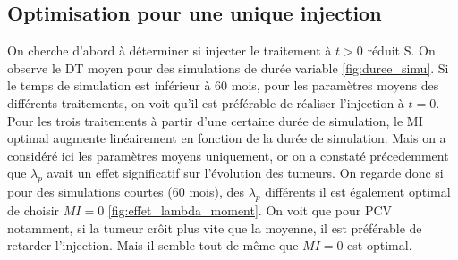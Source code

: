 \documentclass[12pt,a4paper]{article}
\begin{document}
\subsection{Optimisation pour une unique injection}
On cherche d'abord à déterminer si injecter le traitement à $t > 0$  réduit S.  On observe le DT moyen pour des simulations de durée variable \ref{fig:duree_simu}. Si le temps de simulation est inférieur à 60 mois, pour les paramètres moyens des différents traitements, on voit qu'il est préférable de réaliser l'injection à $t=0$.  Pour les trois traitements à partir d'une certaine durée de simulation, le \ac{MI} optimal augmente linéairement en fonction de la durée de simulation. Mais on a considéré ici les paramètres moyens uniquement, or on a constaté précedemment que $\lambda_{p}$ avait un effet significatif sur l'évolution des tumeurs. On regarde donc si pour des simulations courtes (60 mois), des $\lambda_{p}$ différents il est également optimal de choisir $MI = 0$ \ref{fig:effet_lambda_moment}. On voit que pour PCV notamment, si la tumeur crôit plus vite que la moyenne, il est préférable de retarder l'injection. Mais il semble tout de même que $MI = 0$ est optimal.
\end{document}
